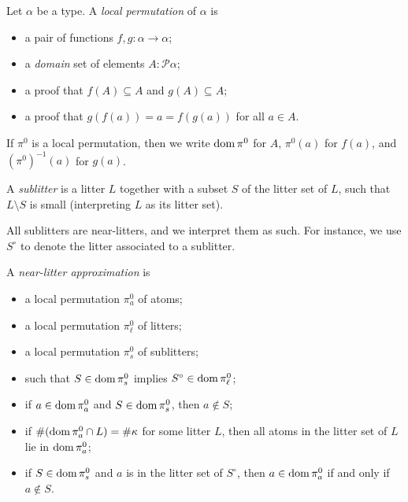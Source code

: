 \documentclass{article}
\begin{document}
\begin{definition}
    Let \( \alpha \) be a type.
    A \emph{local permutation} of \( \alpha \) is
    \begin{itemize}
        \item a pair of functions \( f, g \colon \alpha \to \alpha \);
        \item a \emph{domain} set of elements \( A : \mathcal P \alpha \);
        \item a proof that \( f(A) \subseteq A \) and \( g(A) \subseteq A \);
        \item a proof that \( g(f(a)) = a = f(g(a)) \) for all \( a \in A \).
    \end{itemize}
    If \( \pi^0 \) is a local permutation, then we write \( \operatorname{dom} \pi^0 \) for \( A \), \( \pi^0(a) \) for \( f(a) \), and \( (\pi^0)^{-1}(a) \) for \( g(a) \).
\end{definition}
\begin{definition}
    A \emph{sublitter} is a litter \( L \) together with a subset \( S \) of the litter set of \( L \), such that \( L \setminus S \) is small (interpreting \( L \) as its litter set).
\end{definition}
\begin{remark}
    All sublitters are near-litters, and we interpret them as such.
    For instance, we use \( S^\circ \) to denote the litter associated to a sublitter.
\end{remark}
\begin{definition}
    A \emph{near-litter approximation} is
    \begin{itemize}
        \item a local permutation \( \pi^0_a \) of atoms;
        \item a local permutation \( \pi^0_\ell \) of litters;
        \item a local permutation \( \pi^0_s \) of sublitters;
        \item such that \( S \in \operatorname{dom} \pi^0_s \) implies \( S^\circ \in \operatorname{dom} \pi^0_\ell \);
        \item if \( a \in \operatorname{dom} \pi^0_a \) and \( S \in \operatorname{dom} \pi^0_s \), then \( a \not\in S \);
        \item if \( \#(\operatorname{dom} \pi^0_a \cap L) = \#\kappa \) for some litter \( L \), then all atoms in the litter set of \( L \) lie in \( \operatorname{dom} \pi^0_a \);
        \item if \( S \in \operatorname{dom} \pi^0_s \) and \( a \) is in the litter set of \( S^\circ \), then \( a \in \operatorname{dom} \pi^0_a \) if and only if \( a \not\in S \).
    \end{itemize}
\end{definition}
\end{document}
